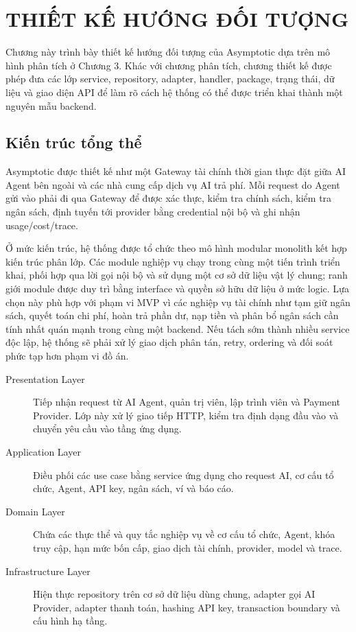 \chapter{THIẾT KẾ HƯỚNG ĐỐI TƯỢNG}

Chương này trình bày thiết kế hướng đối tượng của Asymptotic dựa trên mô hình phân tích ở Chương 3. Khác với chương phân tích, chương thiết kế được phép đưa các lớp service, repository, adapter, handler, package, trạng thái, dữ liệu và giao diện API để làm rõ cách hệ thống có thể được triển khai thành một nguyên mẫu backend.

\section{Kiến trúc tổng thể}

Asymptotic được thiết kế như một Gateway tài chính thời gian thực đặt giữa AI Agent bên ngoài và các nhà cung cấp dịch vụ AI trả phí. Mỗi request do Agent gửi vào phải đi qua Gateway để được xác thực, kiểm tra chính sách, kiểm tra ngân sách, định tuyến tới provider bằng credential nội bộ và ghi nhận usage/cost/trace.

Ở mức kiến trúc, hệ thống được tổ chức theo mô hình modular monolith kết hợp kiến trúc phân lớp. Các module nghiệp vụ chạy trong cùng một tiến trình triển khai, phối hợp qua lời gọi nội bộ và sử dụng một cơ sở dữ liệu vật lý chung; ranh giới module được duy trì bằng interface và quyền sở hữu dữ liệu ở mức logic. Lựa chọn này phù hợp với phạm vi MVP vì các nghiệp vụ tài chính như tạm giữ ngân sách, quyết toán chi phí, hoàn trả phần dư, nạp tiền và phân bổ ngân sách cần tính nhất quán mạnh trong cùng một backend. Nếu tách sớm thành nhiều service độc lập, hệ thống sẽ phải xử lý giao dịch phân tán, retry, ordering và đối soát phức tạp hơn phạm vi đồ án.

\begin{description}
    \item[Presentation Layer] Tiếp nhận request từ AI Agent, quản trị viên, lập trình viên và Payment Provider. Lớp này xử lý giao tiếp HTTP, kiểm tra định dạng đầu vào và chuyển yêu cầu vào tầng ứng dụng.
    \item[Application Layer] Điều phối các use case bằng service ứng dụng cho request AI, cơ cấu tổ chức, Agent, API key, ngân sách, ví và báo cáo.
    \item[Domain Layer] Chứa các thực thể và quy tắc nghiệp vụ về cơ cấu tổ chức, Agent, khóa truy cập, hạn mức bốn cấp, giao dịch tài chính, provider, model và trace.
    \item[Infrastructure Layer] Hiện thực repository trên cơ sở dữ liệu dùng chung, adapter gọi AI Provider, adapter thanh toán, hashing API key, transaction boundary và cấu hình hạ tầng.
\end{description}

